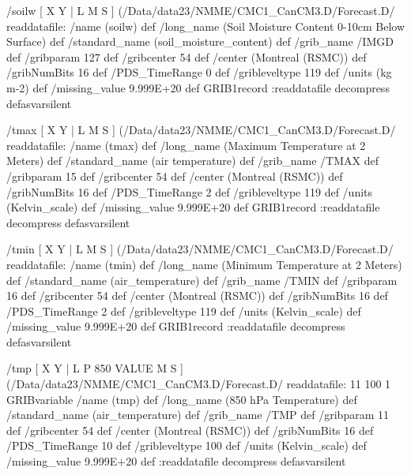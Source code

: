\begin{ingrid}
/soilw {
[ X Y | L M S ] (/Data/data23/NMME/CMC1_CanCM3.D/Forecast.D/%
readdatafile: 
/name (soilw) def
/long_name (Soil Moisture Content 0-10cm Below Surface) def
/standard_name (soil_moisture_content) def
/grib_name /IMGD def
/gribparam 127 def
/gribcenter 54 def
/center (Montreal (RSMC)) def
/gribNumBits 16 def
/PDS_TimeRange 0 def
/gribleveltype 119 def
/units (kg m-2) def
/missing_value 9.999E+20 def
GRIB1record
:readdatafile decompress
} defasvarsilent

/tmax {
[ X Y | L M S ] (/Data/data23/NMME/CMC1_CanCM3.D/Forecast.D/%
readdatafile: 
/name (tmax) def
/long_name (Maximum Temperature at 2 Meters) def
/standard_name (air temperature) def
/grib_name /TMAX def
/gribparam 15 def
/gribcenter 54 def
/center (Montreal (RSMC)) def
/gribNumBits 16 def
/PDS_TimeRange 2 def
/gribleveltype 119 def
/units (Kelvin_scale) def
/missing_value 9.999E+20 def
GRIB1record
:readdatafile decompress
} defasvarsilent

/tmin {
[ X Y | L M S ] (/Data/data23/NMME/CMC1_CanCM3.D/Forecast.D/%
readdatafile: 
/name (tmin) def
/long_name (Minimum Temperature at 2 Meters) def
/standard_name (air_temperature) def
/grib_name /TMIN def
/gribparam 16 def
/gribcenter 54 def
/center (Montreal (RSMC)) def
/gribNumBits 16 def
/PDS_TimeRange 2 def
/gribleveltype 119 def
/units (Kelvin_scale) def
/missing_value 9.999E+20 def
GRIB1record
:readdatafile decompress
} defasvarsilent

/tmp {
[ X Y | L P 850 VALUE M S ] (/Data/data23/NMME/CMC1_CanCM3.D/Forecast.D/%
readdatafile: 
11 100 1 GRIBvariable
/name (tmp) def
/long_name (850 hPa Temperature) def
/standard_name (air_temperature) def
/grib_name /TMP def
/gribparam 11 def
/gribcenter 54 def
/center (Montreal (RSMC)) def
/gribNumBits 16 def
/PDS_TimeRange 10 def
/gribleveltype 100 def
/units (Kelvin_scale) def
/missing_value 9.999E+20 def
:readdatafile decompress
} defasvarsilent


\end{ingrid}
